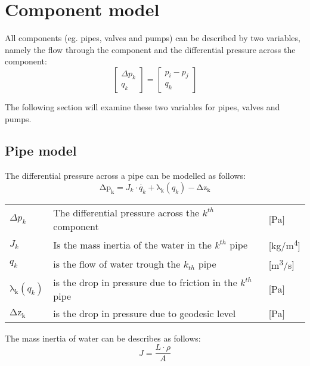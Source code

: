 \section{Component model}
All components (eg. pipes, valves and pumps) can be described by two variables, namely the flow through the component and the differential pressure across the component:
\begin{equation}
\begin{bmatrix} \Delta{p_{k}} \\ q_{k} \end{bmatrix} = 
\begin{bmatrix} p_{i} - p_{j} \\ q_{k} \end{bmatrix}    
\end{equation}

The following section will examine these two variables for pipes, valves and pumps.

\subsection{Pipe model}
The differential pressure across a pipe can be modelled as follows:
\begin{equation}
    \mathrm{\Delta{p_{k}}} = J_{k}\cdot\dot{q_{k}}+\mathrm{\lambda_{k}}(q_{k})-\mathrm{\Delta{z_{k}}}
    \label{eq:Delta_p_pipe}
\end{equation}


	\begin{center}
		\begin{tabular}{l p{8cm} l}
			
			$\Delta{p_{k}}$ & The differential pressure across the $k^{th}$ component & [\si{Pa}]\\ 
		  	${J_{k}}$ & Is the mass inertia of the water in the $k^{th}$ pipe & [\si{kg}/\si{m^{4}}] \\
		  	$q_{k}$ & is the flow of water trough the $k_{th}$ pipe & [{\si{\meter\cubed}/\si{s}}] \\
		  	$\mathrm{\lambda_{k}}(q_{k})$ & is the drop in pressure due to friction in the $k^{th}$ pipe & [\si{Pa}] \\
		  	$\mathrm{\Delta{z_{k}}}$ & is the drop in pressure due to geodesic level & [\si{Pa}]\\
			\end{tabular}
	\end{center}

The mass inertia of water can be describes as follows:
\begin{equation}
	J= \frac{L\cdot \rho}{A}
\end{equation}

